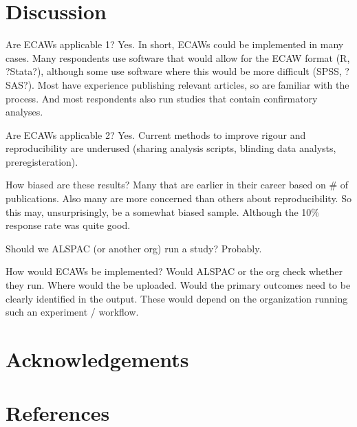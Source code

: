\documentclass[
  man]{apa6}
\newlength{\cslhangindent}
\newlength{\cslentryspacingunit} %
\newenvironment{CSLReferences}[2] %
 {%
  \setlength{\parindent}{0pt}
  \ifodd #1
  \let\oldpar\par
  \def\par{\hangindent=\cslhangindent\oldpar}
  \fi
  \setlength{\parskip}{#2\cslentryspacingunit}
 }%
 {}
\begin{document}
\hypertarget{discussion}{%
\section{Discussion}\label{discussion}}

Are ECAWs applicable 1? Yes. In short, ECAWs could be implemented in many cases. Many respondents use software that would allow for the ECAW format (R, ?Stata?), although some use software where this would be more difficult (SPSS, ?SAS?). Most have experience publishing relevant articles, so are familiar with the process. And most respondents also run studies that contain confirmatory analyses.

Are ECAWs applicable 2? Yes. Current methods to improve rigour and reproducibility are underused (sharing analysis scripts, blinding data analysts, preregisteration).

How biased are these results? Many that are earlier in their career based on \# of publications. Also many are more concerned than others about reproducibility. So this may, unsurprisingly, be a somewhat biased sample. Although the 10\% response rate was quite good.

Should we ALSPAC (or another org) run a study? Probably.

How would ECAWs be implemented? Would ALSPAC or the org check whether they run. Where would the be uploaded. Would the primary outcomes need to be clearly identified in the output. These would depend on the organization running such an experiment / workflow.

\hypertarget{acknowledgements}{%
\section{Acknowledgements}\label{acknowledgements}}

\newpage

\hypertarget{references}{%
\section{References}\label{references}}

\hypertarget{refs}{}
\begin{CSLReferences}{0}{0}
\end{CSLReferences}
\end{document}
